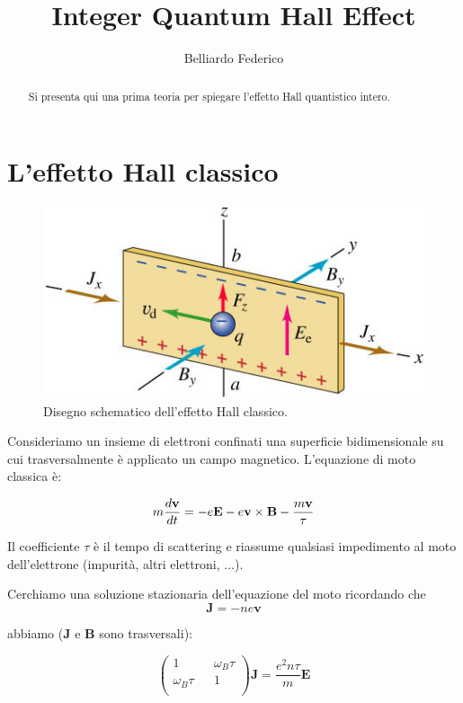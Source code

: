 \documentclass[12pt,a4paper]{article}
\author{Belliardo Federico}
\title{Integer Quantum Hall Effect}
\begin{document}
\maketitle

\begin{abstract}
Si presenta qui una prima teoria per spiegare l'effetto Hall quantistico intero.
\end{abstract}

\section{L'effetto Hall classico}

\begin{figure}[!htb]
\centering
\includegraphics[scale=1.0]{immagini/classicalHall.png}
\caption{Disegno schematico dell'effetto Hall classico.\label{alpha}}
\end{figure}

Consideriamo un insieme di elettroni confinati una superficie bidimensionale su cui trasversalmente è applicato un campo magnetico. L'equazione di moto classica è:

\begin{equation}
m \frac{d \mathbf{v}}{d t} = - e \bold{E} - e \mathbf{v} \times \mathbf{B} - \frac{m \mathbf{v}}{\tau}
\end{equation}

Il coefficiente $\tau$ è il tempo di scattering e riassume qualsiasi impedimento al moto dell'elettrone (impurità, altri elettroni, ...).

Cerchiamo una soluzione stazionaria dell'equazione del moto ricordando che 
\begin{equation}
\mathbf{J} = - n e \mathbf{v}
\end{equation}

abbiamo ($\mathbf{J}$ e $\mathbf{B}$ sono trasversali):

\begin{equation}
\left(
\begin{matrix}
1 && \omega_B \tau \\
\omega_B \tau && 1\\
\end{matrix}
\right)
\mathbf{J} = \frac{e^2 n \tau}{m} \mathbf{E}
\end{equation}
\end{document}
